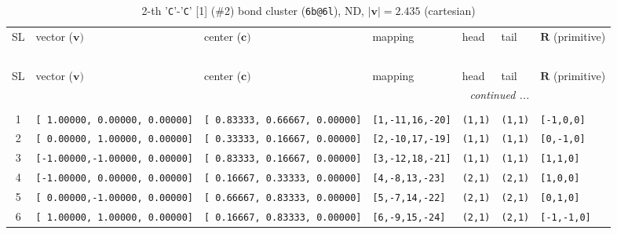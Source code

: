 \documentclass[fleqn,10pt,landscape]{jsarticle}
\begin{document}
\begin{longtable}[l]{cllllll}
\captionsetup{justification=raggedright, singlelinecheck=off}
\caption{2-th '\texttt{C}'-'\texttt{C}' [1] (\#2) bond cluster (\texttt{6b@6l}), ND, $|\bm{v}|=2.435$ (cartesian)}
 \\
 \hline \hline
SL & vector ($\bm{v})$ & center ($\bm{c})$ & mapping & head & tail & $\bm{R}$ (primitive) \\ \hline \endfirsthead

\multicolumn{6}{l}{\tablename\ \thetable{}} \\
 \hline \hline
SL & vector ($\bm{v})$ & center ($\bm{c})$ & mapping & head & tail & $\bm{R}$ (primitive) \\ \hline \endhead

 \hline \hline
\multicolumn{6}{r}{\footnotesize\it continued ...} \\ \endfoot

 \hline \hline
\multicolumn{6}{r}{} \\ \endlastfoot

1 & \texttt{[ 1.00000, 0.00000, 0.00000]} & \texttt{[ 0.83333, 0.66667, 0.00000]} & \texttt{[1,-11,16,-20]} & \texttt{(1,1)} & \texttt{(1,1)} & \texttt{[-1,0,0]} \\ \hline
2 & \texttt{[ 0.00000, 1.00000, 0.00000]} & \texttt{[ 0.33333, 0.16667, 0.00000]} & \texttt{[2,-10,17,-19]} & \texttt{(1,1)} & \texttt{(1,1)} & \texttt{[0,-1,0]} \\ \hline
3 & \texttt{[-1.00000,-1.00000, 0.00000]} & \texttt{[ 0.83333, 0.16667, 0.00000]} & \texttt{[3,-12,18,-21]} & \texttt{(1,1)} & \texttt{(1,1)} & \texttt{[1,1,0]} \\ \hline
4 & \texttt{[-1.00000, 0.00000, 0.00000]} & \texttt{[ 0.16667, 0.33333, 0.00000]} & \texttt{[4,-8,13,-23]} & \texttt{(2,1)} & \texttt{(2,1)} & \texttt{[1,0,0]} \\ \hline
5 & \texttt{[ 0.00000,-1.00000, 0.00000]} & \texttt{[ 0.66667, 0.83333, 0.00000]} & \texttt{[5,-7,14,-22]} & \texttt{(2,1)} & \texttt{(2,1)} & \texttt{[0,1,0]} \\ \hline
6 & \texttt{[ 1.00000, 1.00000, 0.00000]} & \texttt{[ 0.16667, 0.83333, 0.00000]} & \texttt{[6,-9,15,-24]} & \texttt{(2,1)} & \texttt{(2,1)} & \texttt{[-1,-1,0]} \\
\end{longtable}
\renewcommand{\arraystretch}{1.6}
\end{document}

